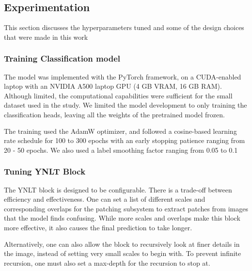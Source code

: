 \documentclass[final,3p,times,twocolumn]{elsarticle}
\begin{document}
\subsection{Experimentation}
This section discusses the hyperparameters tuned and some of the design choices that were made in this work 
\subsubsection{Training Classification model}
The model was implemented with the PyTorch framework, on a CUDA-enabled laptop with an NVIDIA A500 laptop GPU (4 GB VRAM, 16 GB RAM). Although limited, the computational capabilities were sufficient for the small dataset used in the study. We limited the model development to only training the classification heads, leaving all the weights of the pretrained model frozen. 

The training used the AdamW optimizer, and followed a cosine-based learning rate schedule for 100 to 300 epochs with an early stopping patience ranging from 20 - 50 epochs. We also used a label smoothing factor ranging from 0.05 to 0.1

\subsubsection{Tuning YNLT Block}
The YNLT block is designed to be configurable. There is a trade-off between efficiency and effectiveness. One can set a list of different scales and corresponding overlaps for the patching subsystem to extract patches from images that the model finds confusing. While more scales and overlaps make this block more effective, it also causes the final prediction to take longer. 

Alternatively, one can also allow the block to recursively look at finer details in the image, instead of setting very small scales to begin with. To prevent infinite recursion, one must also set a max-depth for the recursion to stop at.
\end{document}
